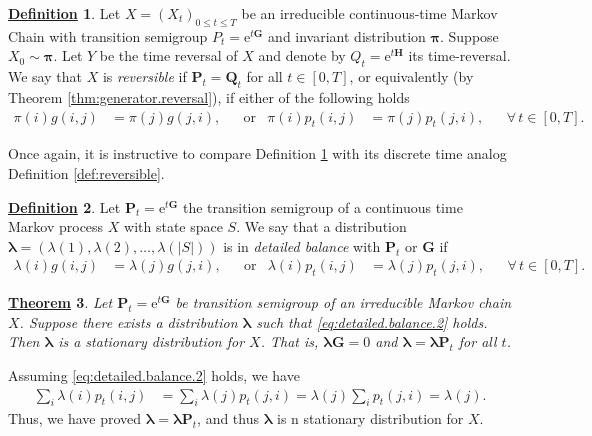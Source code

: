 \documentclass[12pt]{book}
\numberwithin{equation}{chapter}
\theoremstyle{plain}
\newtheorem{theorem}{\underline{Theorem}}
\numberwithin{theorem}{section}
\theoremstyle{definition}
\newtheorem{definition}[theorem]{\underline{Definition}}
\numberwithin{exercise}{chapter}
\let\oldendproof\endproof
\renewenvironment{proof}[1][\proofname]{%
  \oldproof[\scshape\underline{#1}]%
}{\oldendproof}
\newcommand{\<}{\langle}
\renewcommand{\>}{\rangle}
\renewcommand{\(}{\left(}
\renewcommand{\)}{\right)}
\renewcommand{\[}{\left[}
\renewcommand{\]}{\right]}
\newcommand\lam{\lambda}
\newcommand\Gv{\pmb{G}}
\newcommand\Pv{\pmb{P}}
\newcommand\Qv{\pmb{Q}}
\newcommand\Hv{\pmb{H}}
\newcommand\piv{\pmb{\pi}}
\newcommand\lamv{\pmb{\lambda}}
\newcommand\ee{\mathrm{e}}
\begin{document}

\begin{definition}
\label{def:reversible.2}
Let $X = (X_t)_{0 \leq t \leq T}$ be an irreducible continuous-time Markov Chain with transition semigroup $P_t = \ee^{t \Gv}$ and invariant distribution $\piv$.  Suppose $X_0 \sim \piv$.  Let $Y$ be the time reversal of $X$ and denote by $Q_t = \ee^{t \Hv}$ its time-reversal.  We say that $X$ is \textit{reversible} if $\Pv_t = \Qv_t$ for all $t \in [0,T]$, or equivalently (by Theorem \ref{thm:generator.reversal}), if either of the following holds
\begin{align}
\pi(i) g(i,j) 
	&=	\pi(j) g(j,i) ,  &
	&\text{or} &
\pi(i) p_t(i,j)
	&=	\pi(j) p_t(j,i) , &
	&\forall \, t \in [0,T] .
\end{align}
\end{definition}

\noindent
Once again, it is instructive to compare Definition \ref{def:reversible.2} with its discrete time analog Definition \ref{def:reversible}.

\begin{definition}
\label{def:detailed.balance.2}
Let $\Pv_t = \ee^{t \Gv}$ the transition semigroup of a continuous time Markov process $X$ with state space $S$.
We say that a distribution $\lamv = (\lam(1), \lam(2), \ldots, \lam(|S|))$ is in \emph{detailed balance} with $\Pv_t$ or $\Gv$ if
\begin{align}
\lam(i) g(i,j) 
	&=	\lam(j) g(j,i) ,  &
	&\text{or} &
\lam(i) p_t(i,j)
	&=	\lam(j) p_t(j,i) , &
	&\forall \, t \in [0,T] . \label{eq:detailed.balance.2}
\end{align}
\end{definition}

\begin{theorem}
\label{theorem: rev.stat.}
Let $\Pv_t = \ee^{t \Gv}$ be transition semigroup of an irreducible Markov chain $X$.
Suppose there exists a distribution $\lamv$ such that \eqref{eq:detailed.balance.2} holds.
Then $\lamv$ is a stationary distribution for $X$.  That is, $\lamv \Gv = 0$ and $\lamv = \lamv \Pv_t$ for all $t$.
\end{theorem}

\begin{proof}
Assuming \eqref{eq:detailed.balance.2} holds, we have
\begin{align}
\sum_i \lam(i) p_t(i,j)
	&=	\sum_i \lam(j) p_t(j,i)
	=		\lam(j) \sum_i p_t(j,i)
	=		\lam(j) .
\end{align}
Thus, we have proved $\lamv = \lamv \Pv_t$, and thus $\lamv$ is n stationary distribution for $X$.
\end{proof}
\end{document}

